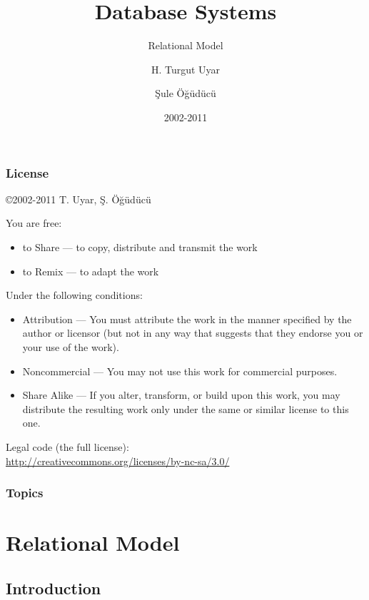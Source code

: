 \documentclass[dvipsnames]{beamer}
\title{Database Systems}
\subtitle{Relational Model}
\author{H. Turgut Uyar \and Şule Öğüdücü}
\date{2002-2011}
\theoremstyle{plain}
\begin{document}
\begin{frame}
  \titlepage
\end{frame}

\begin{frame}
  \frametitle{License}

  \hfill
  \copyright 2002-2011 T. Uyar, Ş. Öğüdücü

  \vfill
  \begin{tiny}
    You are free:
    \begin{itemize}
      \item to Share — to copy, distribute and transmit the work
      \item to Remix — to adapt the work
    \end{itemize}

    Under the following conditions:
    \begin{itemize}
      \item Attribution — You must attribute the work in the manner specified by
        the author or licensor (but not in any way that suggests that they
        endorse you or your use of the work).

      \item Noncommercial — You may not use this work for commercial purposes.

      \item Share Alike — If you alter, transform, or build upon this work, you
        may distribute the resulting work only under the same or similar license
        to this one.
    \end{itemize}
  \end{tiny}

  \vfill
  Legal code (the full license):\\
  \url{http://creativecommons.org/licenses/by-nc-sa/3.0/}
\end{frame}

\begin{frame}
  \frametitle{Topics}
  \tableofcontents
\end{frame}

\section{Relational Model}

\subsection{Introduction}
\end{document}
